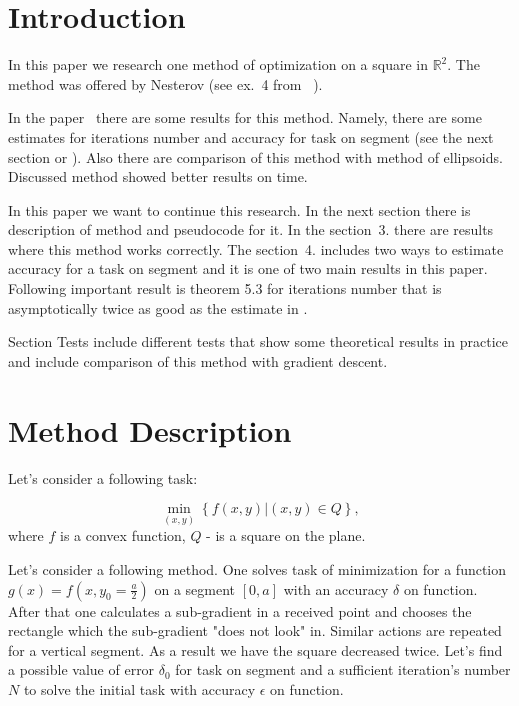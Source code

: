 \documentclass[12pt]{article}
\begin{document}
\tableofcontents
\newpage

\section{Introduction}

In this paper we research one method of optimization on a square in $\mathbb{R}^2$. The method was offered by Nesterov (see ex.~4 from ~\cite{task}). 

In the paper~\cite{Ston_Pas} there are some results for this method. Namely, there are some estimates for iterations number and accuracy for task on segment (see the next section or \cite{Ston_Pas}). Also there are comparison of this method with method of ellipsoids. Discussed method showed better results on time.

In this paper we want to continue this research. In the next section there is description of method and pseudocode for it. In the section~3. there are results where this method works correctly. The section~4. includes two ways to estimate accuracy for a task on segment and it is one of two main results in this paper. Following important result is theorem 5.3 for iterations number that is asymptotically twice as good as the estimate in \cite{Ston_Pas}.

Section Tests include different tests that show some theoretical results in practice and include comparison of this method with gradient descent. 

\section{Method Description}

Let's consider a following task:

$$\min_{(x,y)}\left\{f(x,y)|(x,y) \in Q\right\},$$
where $f$ is a convex function, $Q$ - is a square on the plane.

Let's consider a following method. One solves task of minimization for a function $g(x) = f\left(x, y_0 = \frac{a}{2}\right)$ on a segment $[0, a]$ with an accuracy $\delta$ on function. After that one calculates a sub-gradient in a received point and chooses the rectangle which the sub-gradient "does not look" in. Similar actions are repeated for a vertical segment. As a result we have the square decreased twice. Let's find a possible value of error $\delta_0$ for task on segment and a sufficient iteration's number $N$ to solve the initial task with accuracy $\epsilon$ on function.
\end{document}
